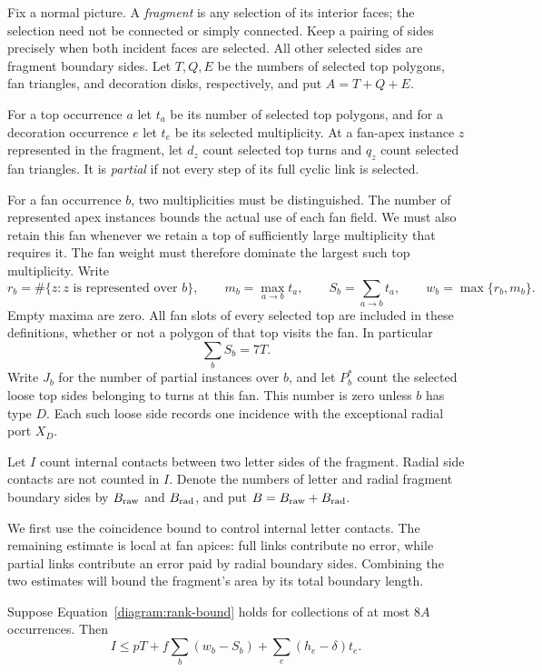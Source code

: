 Fix a normal picture.  A \emph{fragment} is any selection of its
interior faces; the selection need not be connected or simply
connected.  Keep a pairing of sides precisely when both incident faces
are selected.  All other selected sides are fragment boundary sides.
Let $T,Q,E$ be the numbers of selected top polygons, fan triangles, and
decoration disks, respectively, and put $A=T+Q+E$.

For a top occurrence $a$ let $t_a$ be its number of selected top
polygons, and for a decoration occurrence $e$ let $t_e$ be its selected
multiplicity.  At a fan-apex instance $z$ represented in the fragment,
let $d_z$ count selected top turns and $q_z$ count selected fan
triangles.  It is \emph{partial} if not every step of its full cyclic
link is selected.

For a fan occurrence $b$, two multiplicities must be distinguished.
The number of represented apex instances bounds the actual use of
each fan field. We must also retain this fan whenever we retain a top
of sufficiently large multiplicity that requires it. The fan weight
must therefore dominate the largest such top multiplicity. Write
\[
 r_b=\#\{z:z\text{ is represented over }b\},\qquad
 m_b=\max_{a\to b}t_a,\qquad
 S_b=\sum_{a\to b}t_a,\qquad
 w_b=\max\{r_b,m_b\}.
\]
Empty maxima are zero.  All fan slots of every selected top are
included in these definitions, whether or not a polygon of that top
visits the fan.  In particular
\begin{equation}\label{diagram:slot-sum}
 \sum_b S_b=7T.
\end{equation}
Write $J_b$ for the number of partial instances over $b$, and let
$P_b^*$ count the selected loose top sides belonging to turns at this
fan.  This number is zero unless $b$ has type $D$.  Each such loose side
records one incidence with the exceptional radial port $X_D$.

Let $I$ count internal contacts between two letter sides of the
fragment.  Radial side contacts are not counted in $I$.  Denote the
numbers of letter and radial fragment boundary sides by $B_{\rm raw}$
and $B_{\rm rad}$, and put $B=B_{\rm raw}+B_{\rm rad}$.

We first use the coincidence bound to control internal letter contacts.
The remaining estimate is local at fan apices: full links contribute
no error, while partial links contribute an error paid by radial
boundary sides.  Combining the two estimates will bound the fragment's
area by its total boundary length.

\begin{lemma}\label{diagram:weighted-rank}
Suppose Equation~\eqref{diagram:rank-bound} holds for collections of at
most $8A$ occurrences.  Then
\begin{equation}\label{diagram:contact-bound}
 I\le pT+f\sum_b(w_b-S_b)
              +\sum_e(h_e-\delta)t_e.
\end{equation}
\end{lemma}

